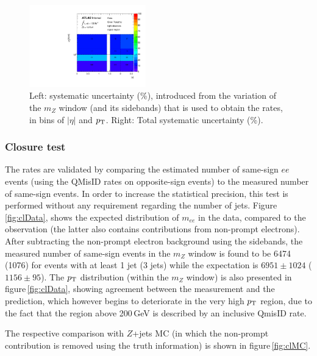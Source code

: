 \begin{figure}[p!]
\begin{center}
  \includegraphics[width=0.45\textwidth]{figures/qmisid/syst_Data_Total_tight_sr}
  \caption{ \label{fig:QMisID:systb} Left: systematic uncertainty (\%), introduced from the variation of the $m_{Z}$ window
  (and its sidebands) that is used to obtain the rates, in bins of $|\eta|$ and $p_{\mathrm{T}}$. Right: Total systematic uncertainty (\%).}
  \end{center}
\end{figure}

\subsubsection{Closure test}
\label{Sec:closure}

The rates are validated by comparing the estimated number of same-sign $ee$ events (using the QMisID rates on
opposite-sign events) to the measured number of same-sign events. In order to increase the statistical
precision, this test is performed without any requirement regarding the number of jets. 
Figure\,\ref{fig:clData}, shows the expected distribution of $m_{ee}$ in the data, compared to the observation
(the latter also contains contributions from non-prompt electrons). 
After subtracting the non-prompt electron background using the sidebands, the
measured number of same-sign events in the $m_{Z}$ window is found to be 6474
(1076) for events with at least 1 jet (3 jets) while the expectation is
$6951 \pm 1024$ ($1156 \pm 95$). The $p_{\mathrm{T}}$ distribution (within the $m_{Z}$ window) is also presented 
in figure\,\ref{fig:clData}, showing agreement between the measurement and the prediction, which however begins 
to deteriorate in the very high $p_{\mathrm{T}}$ region, due to the fact that the region above 200\,GeV is described by an 
inclusive QmisID rate.

The respective comparison with $Z$+jets MC (in which the non-prompt contribution is removed using the truth 
information) is shown in figure\,\ref{fig:clMC}.

